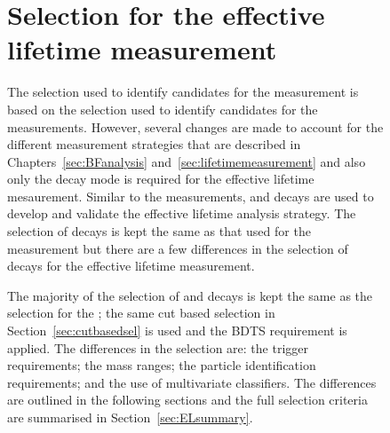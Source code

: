 \begin{figure}[tbp]
\section{Selection for the effective lifetime measurement}
\label{sec:ELsel}
The selection used to identify candidates for the \el measurement is based on the selection used to identify candidates for the \BF measurements. However, several changes are made to account for the different measurement strategies that are described in Chapters~\ref{sec:BFanalysis} and~\ref{sec:lifetimemeasurement} and also only the \bs decay mode is required for the effective lifetime mesaurement. 
Similar to the \BF measurements, \bhh and \bsjpsiphi decays are used to develop and validate the effective lifetime analysis strategy. The selection of \bsjpsiphi decays is kept the same as that used for the \BF measurement but there are a few differences in the selection of \bhh decays for the effective lifetime measurement.

The majority of the selection of \bsmumu and \bhh decays is kept the same as the selection for the \BFm; the same cut based selection in Section~\ref{sec:cutbasedsel} is used and the BDTS requirement is applied.   
The differences in the selection are: the trigger requirements; the mass ranges; the particle identification requirements; and the use of multivariate classifiers. The differences are outlined in the following sections and the full selection criteria are summarised in Section~\ref{sec:ELsummary}.



\end{figure}
